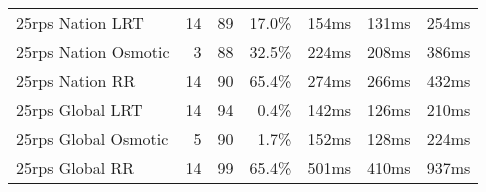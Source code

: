 \begin{table}[]
\begin{tabular}{lrrrrrr}
25rps Nation LRT     & 14                                                             & 89                                                                                        & 17.0\%                                                                        & 154ms                                                       & 131ms                                                         & 254ms                                                      \\
25rps Nation Osmotic & 3                                                              & 88                                                                                        & 32.5\%                                                                        & 224ms                                                       & 208ms                                                         & 386ms                                                      \\
25rps Nation RR      & 14                                                             & 90                                                                                        & 65.4\%                                                                        & 274ms                                                       & 266ms                                                         & 432ms                                                      \\ \hline
25rps Global LRT     & 14                                                             & 94                                                                                        & 0.4\%                                                                         & 142ms                                                       & 126ms                                                         & 210ms                                                      \\
25rps Global Osmotic & 5                                                              & 90                                                                                        & 1.7\%                                                                         & 152ms                                                       & 128ms                                                         & 224ms                                                      \\
25rps Global RR      & 14                                                             & 99                                                                                        & 65.4\%                                                                        & 501ms                                                       & 410ms                                                         & 937ms                                                      \\ \hline

\end{tabular}
\end{table}
